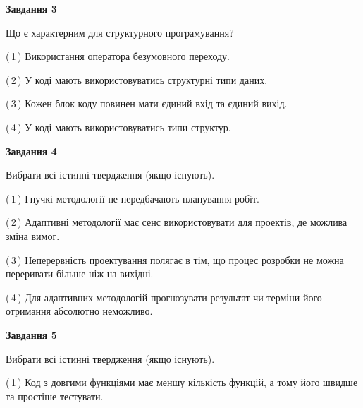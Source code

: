 \documentclass[10pt, ukrainian]{article}
\begin{document}
{\begin {large}
{\begin {center}\textbf{Завдання 3}\end {center}}\par
Що є характерним для структурного програмування?\par
\vspace{2mm}



(\,1\,) Використання оператора безумовного переходу. %



(\,2\,) У коді мають використовуватись структурні типи даних. %



(\,3\,) Кожен блок коду повинен мати єдиний вхід та єдиний вихід.%



(\,4\,) У коді мають використовуватись типи структур. %


{\begin {center}\textbf{Завдання 4}\end {center}}\par
Вибрати всі істинні твердження (якщо існують).\par
\vspace{2mm}



(\,1\,) Гнучкі методології не передбачають планування робіт. %



(\,2\,) Адаптивні методології має сенс використовувати для проектів, де можлива зміна вимог. %



(\,3\,) Неперервність проектування полягає в тім, що процес розробки не можна переривати більше ніж на вихідні. %



(\,4\,) Для адаптивних методологій прогнозувати результат чи терміни його отримання абсолютно неможливо. %


{\begin {center}\textbf{Завдання 5}\end {center}}\par
Вибрати всі істинні твердження (якщо існують).\par
\vspace{2mm}



(\,1\,) Код з довгими функціями має меншу кількість функцій, а тому його швидше та простіше тестувати. %




\end{large}}
\end{document}
